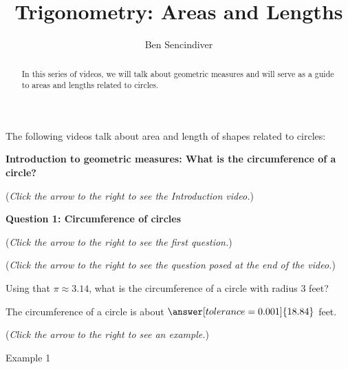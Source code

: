 \documentclass{ximera}
\title[Prerequisite Videos: ]{Trigonometry: Areas and Lengths}
\author{Ben Sencindiver}
\begin{document}
\begin{abstract}
  In this series of videos, we will talk about geometric measures and will
  serve as a guide to areas and lengths related to circles.
\end{abstract}
\maketitle

The following videos talk about area and length of shapes related to circles:

\textbf{Introduction to geometric measures: What is the circumference
of a circle?}
\begin{explanation}
\begin{flushright}
{\color{blue}(\emph{Click the arrow to the right to see the Introduction video.})}
\end{flushright}
\begin{center}
\begin{expandable}
\end{expandable}
\end{center}
\end{explanation}

\textbf{Question 1: Circumference of circles}
\begin{question}
\begin{flushright}
{\color{blue}(\emph{Click the arrow to the right to see the first question.})}
\end{flushright}
\begin{center}
\begin{expandable}
{\color{blue}(\emph{Click the arrow to the right to see the question
posed at the end of the video.})}
\begin{expandable}
Using that $\pi\approx 3.14$, what is the circumference of a circle with radius $3$ feet?\\
\begin{prompt}
The circumference of a circle is about $\answer[tolerance=0.001]{18.84}$ feet.
\end{prompt}
\begin{flushright}
{\color{blue}(\emph{Click the arrow to the right to see an example.})}
\end{flushright}
\begin{expandable}
Example 1
\end{expandable}
\end{expandable}
\end{expandable}
\end{center}
\end{question}
\end{document}
